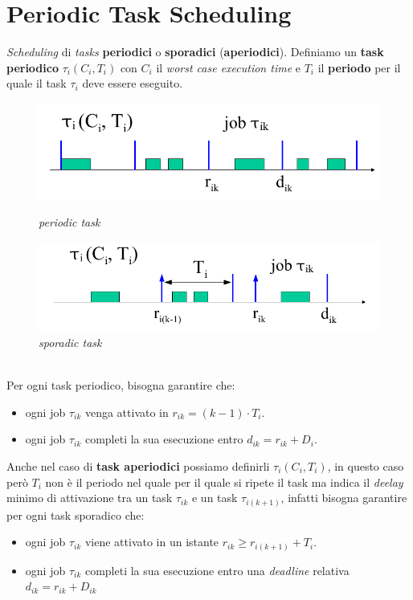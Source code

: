 \chapter{Periodic Task Scheduling}
\textit{Scheduling} di \textit{tasks} \textbf{periodici} o \textbf{sporadici} (\textbf{aperiodici}). Definiamo un \textbf{task periodico} $\tau_i(C_i, T_i)$ con $C_i$ il \textit{worst case execution time} e $T_i$ il \textbf{periodo} per il quale il task $\tau_i$ deve essere eseguito.
\begin{figure}[h]
    \centering
    \begin{minipage}[t]{0.45\textwidth}
        \centering
        \includegraphics[width=\textwidth]{img/T_aT}
        \caption{\textit{periodic task}}
    \end{minipage}
    \begin{minipage}[t]{0.45\textwidth}
        \centering
        \includegraphics[width=\textwidth]{img/T_aT_1}
        \caption{\textit{sporadic task}}
    \end{minipage}
\end{figure}
\\
Per ogni task periodico, bisogna garantire che:
\begin{itemize}
    \item ogni job $\tau_{ik}$ venga attivato in $r_{ik} = (k - 1) \cdot T_i$.
    \item ogni job $\tau_{ik}$ completi la sua esecuzione entro $d_{ik} = r_{ik} + D_i$.
\end{itemize}
Anche nel caso di \textbf{task aperiodici} possiamo definirli $\tau_i(C_i,T_i)$, in questo caso però $T_i$ non è il periodo nel quale per il quale si ripete il task ma indica il \textit{deelay} minimo di attivazione tra un task $\tau_{ik}$ e un task $\tau_{i(k+1)}$, infatti bisogna garantire per ogni task sporadico che:
\begin{itemize}
    \item ogni job $\tau_{ik}$ viene attivato in un istante $r_{ik} \geq r_{i(k+1)} + T_i$.
    \item ogni job $\tau_{ik}$ completi la sua esecuzione entro una \textit{deadline} relativa $d_{ik} = r_{ik} + D_{ik}$
\end{itemize}

